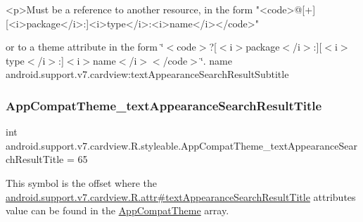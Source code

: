 \begin{DoxyVerb}      <p>Must be a reference to another resource, in the form "<code>@[+][<i>package</i>:]<i>type</i>:<i>name</i></code>"
\end{DoxyVerb}
 or to a theme attribute in the form \char`\"{}$<$code$>$?\mbox{[}$<$i$>$package$<$/i$>$\+:\mbox{]}\mbox{[}$<$i$>$type$<$/i$>$\+:\mbox{]}$<$i$>$name$<$/i$>$$<$/code$>$\char`\"{}.  name android.\+support.\+v7.\+cardview\+:text\+Appearance\+Search\+Result\+Subtitle \mbox{\label{classandroid_1_1support_1_1v7_1_1cardview_1_1R_1_1styleable_a1b75dd408c582ec70493e7f69ec4ad8e}} 
\subsubsection{\texorpdfstring{App\+Compat\+Theme\+\_\+text\+Appearance\+Search\+Result\+Title}{AppCompatTheme\_textAppearanceSearchResultTitle}}
{\footnotesize\ttfamily int android.\+support.\+v7.\+cardview.\+R.\+styleable.\+App\+Compat\+Theme\+\_\+text\+Appearance\+Search\+Result\+Title = 65\hspace{0.3cm}{\ttfamily [static]}}

This symbol is the offset where the \hyperlink{classandroid_1_1support_1_1v7_1_1cardview_1_1R_1_1attr_a7ef9f14e832603a80a69a476d01e22f3}{android.\+support.\+v7.\+cardview.\+R.\+attr\#text\+Appearance\+Search\+Result\+Title} attribute\textquotesingle{}s value can be found in the \hyperlink{classandroid_1_1support_1_1v7_1_1cardview_1_1R_1_1styleable_a52e6f69f954ecc2622d72c0b4d298938}{App\+Compat\+Theme} array.

